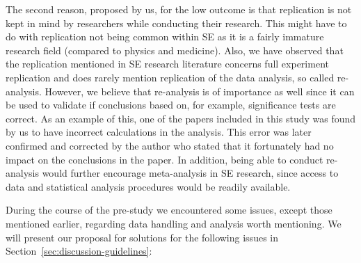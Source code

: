 The second reason, proposed by us, for the low outcome is that replication is not kept in mind by researchers while conducting their research. This might have to do with replication not being common within SE as it is a fairly immature research field (compared to physics and medicine). Also, we have observed that the replication mentioned in SE research literature concerns full experiment replication and does rarely mention replication of the data analysis, so called re-analysis. However, we believe that re-analysis is of importance as well since it can be used to validate if conclusions based on, for example, significance tests are correct. As an example of this, one of the papers included in this study was found by us to have incorrect calculations in the analysis. This error was later confirmed and corrected by the author who stated that it fortunately had no impact on the conclusions in the paper. In addition, being able to conduct re-analysis would further encourage meta-analysis in SE research, since access to data and statistical analysis procedures would be readily available.


During the course of the pre-study we encountered some issues, except those mentioned earlier, regarding data handling and analysis worth mentioning. We will present our proposal for solutions for the following issues in Section~\ref{sec:discussion-guidelines}:


